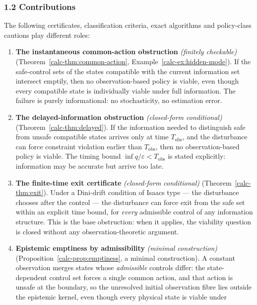 \documentclass[10pt,twocolumn]{article}
\theoremstyle{definition}
\begin{document}
\subsubsection{1.2 Contributions}\label{calc-contributions}

The following certificates, classification criteria, exact algorithms and
policy-class cautions play different roles:

\begin{enumerate}
\def\labelenumi{\arabic{enumi}.}
\item
  \textbf{The instantaneous common-action obstruction} \emph{(finitely checkable)} (Theorem~\ref{calc-thm:common-action},
  Example~\ref{calc-ex:hidden-mode}). If the safe-control sets of the states compatible with the
  current information set intersect emptily, then no observation-based
  policy is viable, even though every compatible state is individually
  viable under full information. The failure is purely informational: no
  stochasticity, no estimation error.
\item
  \textbf{The delayed-information obstruction} \emph{(closed-form conditional)} (Theorem~\ref{calc-thm:delayed}). If the
  information needed to distinguish safe from unsafe compatible states
  arrives only at time \(T_{\mathrm{obs}}\), and the disturbance can
  force constraint violation earlier than \(T_{\mathrm{obs}}\), then no
  observation-based policy is viable. The timing bound
  \(\inf q / \varepsilon < T_{\mathrm{obs}}\) is stated explicitly:
  information may be accurate but arrive too late.
\item
  \textbf{The finite-time exit certificate} \emph{(closed-form conditional)} (Theorem~\ref{calc-thm:exit}). Under a
  Dini-drift condition of Isaacs type --- the disturbance chooses after
  the control --- the disturbance can force exit from the safe set
  within an explicit time bound, for \emph{every} admissible control of
  any information structure. This is the base obstruction: when it
  applies, the viability question is closed without any
  observation-theoretic argument.
\item
  \textbf{Epistemic emptiness by admissibility} \emph{(minimal construction)} (Proposition~\ref{calc-prop:emptiness}, a minimal
  construction). A constant observation merges states whose
  \emph{admissible} controls differ: the state-dependent control set
  forces a single common action, and that action is unsafe at the
  boundary, so the unresolved initial observation fibre lies outside the
  epistemic kernel, even though every physical state is viable under

\end{enumerate}
\end{document}
